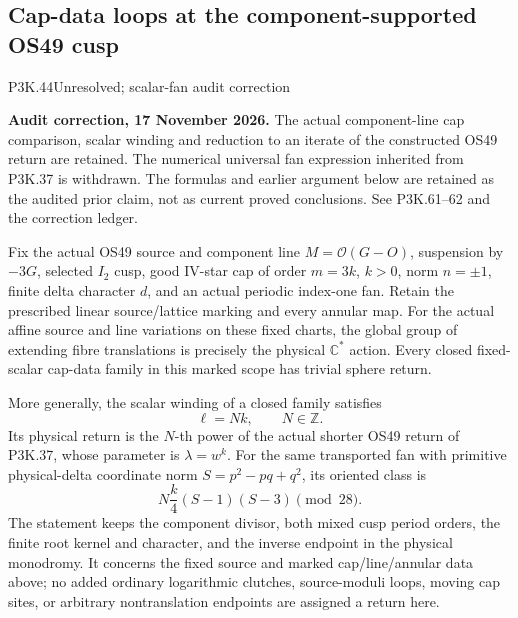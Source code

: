 \subsection{Cap-data loops at the component-supported OS49 cusp}
\begin{statement}{P3K.44}{Unresolved; scalar-fan audit correction}
\par\noindent\textbf{Audit correction, 17 November 2026.} The actual component-line cap comparison, scalar winding and reduction to an iterate of the constructed OS49 return are retained. The numerical universal fan expression inherited from P3K.37 is withdrawn. The formulas and earlier argument below are retained as the audited prior claim, not as current proved conclusions. See P3K.61--62 and the correction ledger.
\medskip


Fix the actual OS49 source and component line
\(M=\mathcal O(G-O)\), suspension by \(-3G\), selected
\(I_2\) cusp, good IV-star cap of order \(m=3k\), \(k>0\),
norm \(n=\pm1\), finite delta character \(d\), and an actual
periodic index-one fan. Retain the prescribed linear source/lattice
marking and every annular map. For the actual affine source and line
variations on these fixed charts, the global group of extending fibre
translations is precisely the physical \(\mathbb C^*\) action.
Every closed fixed-scalar cap-data family in this marked scope has
trivial sphere return.

More generally, the scalar winding of a closed family satisfies
\[
                          \ell=Nk,\qquad N\in\mathbb Z.
\]
Its physical return is the \(N\)-th power of the actual shorter
OS49 return of P3K.37, whose parameter is \(\lambda=w^k\).
For the same transported fan with primitive physical-delta coordinate
norm \(S=p^2-pq+q^2\), its oriented class is
\[
                       N\frac{k}{4}(S-1)(S-3)\pmod{28}.
\]
The statement keeps the component divisor, both mixed cusp period
orders, the finite root kernel and character, and the inverse endpoint
in the physical monodromy. It concerns the fixed source and marked
cap/line/annular data above; no added ordinary logarithmic clutches,
source-moduli loops, moving cap sites, or arbitrary nontranslation
endpoints are assigned a return here.

\end{statement}
